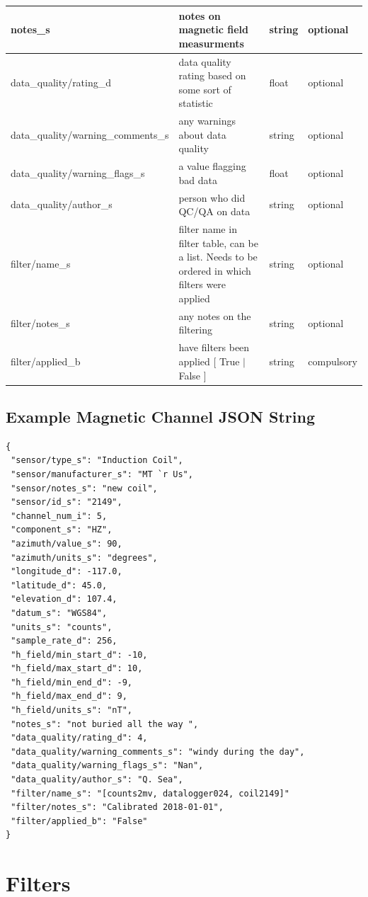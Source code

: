 \documentclass{article}
\begin{document}
\begin{table}[htb!]
\begin{tabular}{|l|p{3in}|l|l|}
		notes\_s & notes on magnetic field measurments & string &  optional \\ \hline
		data\_quality/rating\_d & data quality rating based on some sort of statistic & float &  optional \\ \hline
		data\_quality/warning\_comments\_s & any warnings about data quality & string &   optional \\ \hline
		data\_quality/warning\_flags\_s & a value flagging bad data  & float &  optional \\ \hline
		data\_quality/author\_s & person who did QC/QA on data & string &   optional \\ \hline
		filter/name\_s & filter name in filter table, can be a list. Needs to be ordered in which filters were applied & string &  optional \\ \hline
		filter/notes\_s & any notes on the filtering & string &  optional \\ \hline
		filter/applied\_b & have filters been applied [ True $|$ False ] & string & compulsory \\ \hline
		\end{tabular}
	\label{tab:magnetic}
\end{table}

\newpage
\subsection{Example Magnetic Channel JSON String}

\begin{verbatim}
{
 "sensor/type_s": "Induction Coil",
 "sensor/manufacturer_s": "MT `r Us",
 "sensor/notes_s": "new coil",
 "sensor/id_s": "2149",
 "channel_num_i": 5,
 "component_s": "HZ",
 "azimuth/value_s": 90,
 "azimuth/units_s": "degrees",
 "longitude_d": -117.0,
 "latitude_d": 45.0,
 "elevation_d": 107.4,
 "datum_s": "WGS84",
 "units_s": "counts",
 "sample_rate_d": 256,
 "h_field/min_start_d": -10,
 "h_field/max_start_d": 10,
 "h_field/min_end_d": -9,
 "h_field/max_end_d": 9,
 "h_field/units_s": "nT",
 "notes_s": "not buried all the way ",
 "data_quality/rating_d": 4,
 "data_quality/warning_comments_s": "windy during the day",
 "data_quality/warning_flags_s": "Nan",
 "data_quality/author_s": "Q. Sea",
 "filter/name_s": "[counts2mv, datalogger024, coil2149]"
 "filter/notes_s": "Calibrated 2018-01-01",
 "filter/applied_b": "False"
}
\end{verbatim}

\newpage
\section{Filters}
\end{document}
